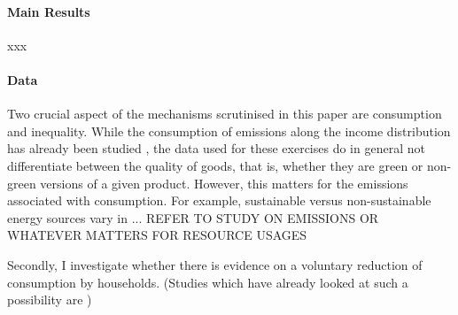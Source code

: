 

\paragraph{Main Results} xxx

\paragraph{Data}
Two crucial aspect of the mechanisms scrutinised in this paper are consumption and inequality. 
While the consumption of emissions along the income distribution has already been studied \citep[e.g.][]{Sager2019IncomeCurves}, the data used for these exercises do in general not differentiate between the quality of goods, that is, whether they are green or non-green versions of a given product. 
However, this matters for the emissions associated with consumption.  For example, sustainable versus non-sustainable energy sources vary in ... REFER TO STUDY ON EMISSIONS OR WHATEVER MATTERS FOR RESOURCE USAGES

Secondly, I investigate whether there is evidence on a voluntary reduction of consumption by households. (Studies which have already looked at such a possibility are )


